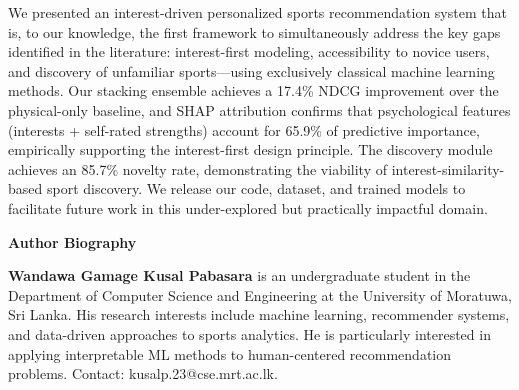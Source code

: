 \documentclass[conference]{IEEEtran}
\begin{document}
We presented an interest-driven personalized sports recommendation system
that is, to our knowledge, the first framework to simultaneously address
the key gaps identified in the literature: interest-first modeling,
accessibility to novice users, and discovery of unfamiliar sports---using
exclusively classical machine learning methods.
Our stacking ensemble achieves a 17.4\% NDCG improvement over
the physical-only baseline, and SHAP attribution confirms that
psychological features (interests + self-rated strengths) account for
65.9\% of predictive importance, empirically supporting the interest-first
design principle.
The discovery module achieves an 85.7\% novelty rate, demonstrating
the viability of interest-similarity-based sport discovery.
We release our code, dataset, and trained models to
facilitate future work in this under-explored but practically impactful domain.




\vspace{1em}
\noindent\textbf{Author Biography}

\smallskip
\noindent\textbf{Wandawa Gamage Kusal Pabasara}
is an undergraduate student in the Department of Computer Science
and Engineering at the University of Moratuwa, Sri Lanka.
His research interests include machine learning, recommender systems,
and data-driven approaches to sports analytics.
He is particularly interested in applying interpretable ML methods
to human-centered recommendation problems.
Contact: kusalp.23@cse.mrt.ac.lk.
\end{document}
